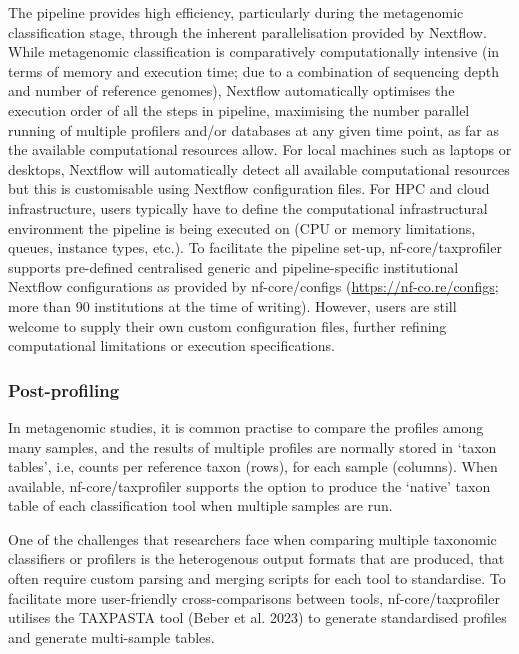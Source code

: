 \documentclass[
]{article}
\begin{document}
The pipeline provides high efficiency, particularly during the
metagenomic classification stage, through the inherent parallelisation
provided by Nextflow. While metagenomic classification is comparatively
computationally intensive (in terms of memory and execution time; due to
a combination of sequencing depth and number of reference genomes),
Nextflow automatically optimises the execution order of all the steps in
pipeline, maximising the number parallel running of multiple profilers
and/or databases at any given time point, as far as the available
computational resources allow. For local machines such as laptops or
desktops, Nextflow will automatically detect all available computational
resources but this is customisable using Nextflow configuration files.
For HPC and cloud infrastructure, users typically have to define the
computational infrastructural environment the pipeline is being executed
on (CPU or memory limitations, queues, instance types, etc.). To
facilitate the pipeline set-up, nf-core/taxprofiler supports pre-defined
centralised generic and pipeline-specific institutional Nextflow
configurations as provided by nf-core/configs
(\url{https://nf-co.re/configs}; more than 90 institutions at the time
of writing). However, users are still welcome to supply their own custom
configuration files, further refining computational limitations or
execution specifications.

\hypertarget{post-profiling}{%
\subsubsection{Post-profiling}\label{post-profiling}}

In metagenomic studies, it is common practise to compare the profiles
among many samples, and the results of multiple profiles are normally
stored in `taxon tables', i.e, counts per reference taxon (rows), for
each sample (columns). When available, nf-core/taxprofiler supports the
option to produce the `native' taxon table of each classification tool
when multiple samples are run.

One of the challenges that researchers face when comparing multiple
taxonomic classifiers or profilers is the heterogenous output formats
that are produced, that often require custom parsing and merging scripts
for each tool to standardise. To facilitate more user-friendly
cross-comparisons between tools, nf-core/taxprofiler utilises the
TAXPASTA tool (Beber et al. 2023) to generate standardised profiles and
generate multi-sample tables.
\end{document}
